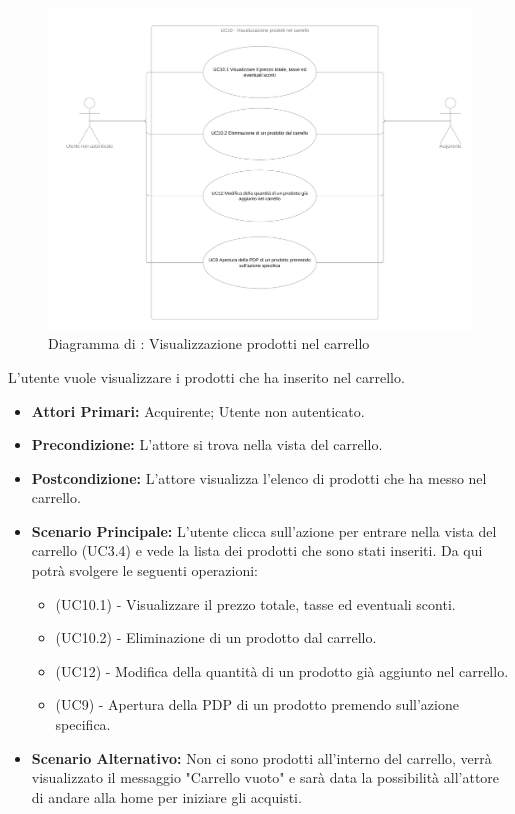 \begin{figure}[H]
    \centering
    \includegraphics[width=\textwidth]{Immagini/DiagrammiUC/UC10VisualizzazioneProdottiNelCarrello.png}
    \caption{Diagramma di \actualUC: Visualizzazione prodotti nel carrello} 
    \label{fig:VisualizzazioneProdottiNelCarrello}
\end{figure}
L'utente vuole visualizzare i prodotti che ha inserito nel carrello.
\begin{itemize}
    \item \textbf{Attori Primari:} Acquirente; Utente non autenticato.
    \item \textbf{Precondizione:} L'attore si trova nella vista del carrello.
    \item \textbf{Postcondizione:} L'attore visualizza l'elenco di prodotti che ha messo nel carrello.
    \item \textbf{Scenario Principale:} L'utente clicca sull'azione per entrare nella vista del carrello (UC3.4) e vede la lista dei prodotti che sono stati inseriti. Da qui potrà svolgere le seguenti operazioni:
    \begin{itemize}
        \item (UC10.1) - Visualizzare il prezzo totale, tasse ed eventuali sconti.
        \item (UC10.2) - Eliminazione di un prodotto dal carrello.
        \item (UC12) - Modifica della quantità di un prodotto già aggiunto nel carrello.
        \item (UC9) - Apertura della PDP di un prodotto premendo sull'azione specifica.
    \end{itemize}
    \item \textbf{Scenario Alternativo:} Non ci sono prodotti all'interno del carrello, verrà visualizzato il messaggio "Carrello vuoto" e sarà data la possibilità all'attore di andare alla home per iniziare gli acquisti.
\end{itemize}

